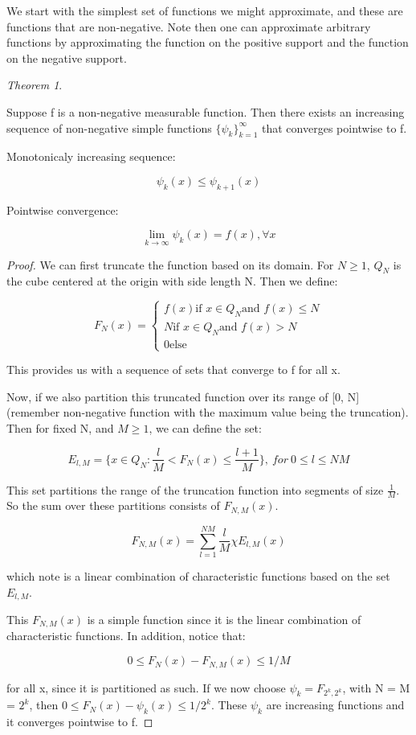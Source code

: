 \documentclass[class=article, crop=false]{standalone}
\theoremstyle{definition}
\theoremstyle{remark}
\theoremstyle{lemma}
\theoremstyle{theorem}
\newtheorem*{theorem}{Theorem}
\theoremstyle{corollary}
\theoremstyle{property}
\begin{document}
			We start with the simplest set of functions we might approximate, and these are functions that are non-negative. Note then one can approximate arbitrary functions by approximating the function on the positive support and the function on the negative support.

			\begin{theorem}
			\label{thm:approx_nonneg_func}

				Suppose f is a non-negative measurable function. Then there exists an increasing sequence of non-negative simple functions $\{\psi_k\}_{k=1}^\infty$ that converges pointwise to f.

				Monotonicaly increasing sequence:

				$$\psi_k(x) \le \psi_{k+1}(x)$$

				Pointwise convergence:

				$$\lim_{k\rightarrow\infty} \psi_k(x) = f(x), \forall x$$

			\end{theorem}
			\begin{proof}
				We can first truncate the function based on its domain. For $N \ge 1$, $Q_N$ is the cube centered at the origin with side length N. Then we define:

					$$F_N(x) = \begin{cases} f(x) \mbox{if } x \in Q_N \mbox{and } f(x) \le N \\ N \mbox{if } x \in Q_N \mbox{and } f(x) > N \\ 0 \mbox{else} \end{cases}$$

				This provides us with a sequence of sets that converge to f for all x. 

				Now, if we also partition this truncated function over its range of [0, N] (remember non-negative function with the maximum value being the truncation). Then for fixed N, and $M \ge 1$, we can define the set:

					$$E_{l, M} = \{ x \in Q_N : \frac{l}{M} < F_N(x) \le \frac{l+1}{M} \},\ for\ 0 \le l \le N M$$

				This set partitions the range of the truncation function into segments of size $\frac{1}{M}$. So the sum over these partitions consists of $F_{N, M}(x)$.

					$$F_{N,M}(x) = \sum_{l=1}^{NM} \frac{l}{M} \chi E_{l, M}(x)$$

				which note is a linear combination of characteristic functions based on the set $E_{l,M}$.

				This $F_{N,M}(x)$ is a simple function since it is the linear combination of characteristic functions. In addition, notice that:

					$$0 \le F_N(x) - F_{N,M}(x) \le 1/M$$

				for all x, since it is partitioned as such. If we now choose $\psi_k = F_{2^k, 2^k}$, with N = M = $2^k$, then $0 \le F_N(x) - \psi_k(x) \le 1 / 2^k$. These $\psi_k$ are increasing functions and it converges pointwise to f.
			\end{proof}
\end{document}
